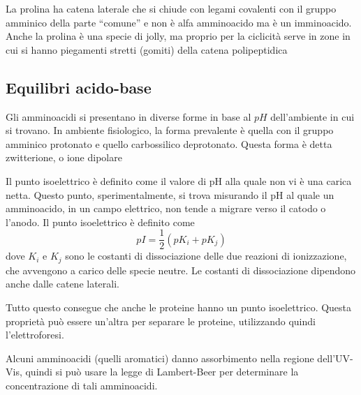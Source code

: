 La prolina ha catena laterale che si chiude con legami covalenti con
il gruppo amminico della parte ``comune'' e non è alfa amminoacido ma è
un imminoacido. Anche la prolina è una specie di jolly, ma proprio per la ciclicità serve
in zone in cui si hanno piegamenti stretti (gomiti) della catena
polipeptidica

\subsection{Equilibri acido-base}

Gli amminoacidi si presentano in diverse forme in base al \(pH\)
dell'ambiente in cui si trovano. In ambiente fisiologico, la forma
prevalente è quella con il gruppo amminico protonato e quello
carbossilico deprotonato. Questa forma è detta zwitterione, o ione
dipolare



Il punto isoelettrico è definito come il valore di pH alla quale non vi
è una carica netta. Questo punto, sperimentalmente, si trova misurando
il pH al quale un amminoacido, in un campo elettrico, non tende a
migrare verso il catodo o l'anodo. Il punto isoelettrico è definito come
\[
pI = \frac{1}{2} (pK_i + pK_j)
\]
dove \(K_i\) e \(K_j\) sono le costanti di dissociazione delle due
reazioni di ionizzazione, che avvengono a carico delle specie neutre. Le
costanti di dissociazione dipendono anche dalle catene laterali.

Tutto questo consegue che anche le proteine hanno un punto isoelettrico.
Questa proprietà può essere un'altra per separare le proteine,
utilizzando quindi l'elettroforesi.


Alcuni amminoacidi (quelli aromatici) danno assorbimento nella regione
dell'UV-Vis, quindi si può usare la legge di Lambert-Beer per
determinare la concentrazione di tali amminoacidi.

